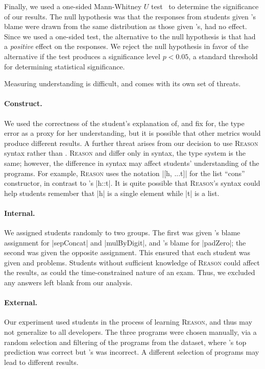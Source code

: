 Finally, we used a one-sided Mann-Whitney $U$ test~\cite{Mann1947-fd} to
determine the significance of our results.
%
The null hypothesis was that the responses from students given
\toolname's blame were drawn from the same distribution as those
given \sherrloc's, \ie \toolname had no effect.
%
Since we used a one-sided test, the alternative to the null hypothesis
is that \toolname had a \emph{positive} effect on the responses.
%
We reject the null hypothesis in favor of the alternative if the test
produces a significance level $p < 0.05$, a standard threshold for
determining statistical significance.

%
Measuring understanding is difficult, and comes with its own
set of threats. %

\paragraph{Construct.}
%
We used the correctness of the student's explanation of, and fix for,
the type error as a proxy for her understanding, but it is possible
that other metrics would produce different results.
%
A further threat arises from our decision to use \textsc{Reason} syntax
rather than \ocaml.
%
\textsc{Reason} and \ocaml differ only in syntax, the type system is the
same; however, the difference in syntax may affect students'
understanding of the programs.
%
For example, \textsc{Reason} uses the notation |[h, ...t]| for the list
``cons'' constructor, in contrast to \ocaml's |h::t|.
%
It is quite possible that \textsc{Reason}'s syntax could help students
remember that |h| is a single element while |t| is a list.

\paragraph{Internal.}
%
We assigned students randomly to two groups. The first was given
\sherrloc's blame assignment for |sepConcat| and |mulByDigit|, and
\toolname's blame for |padZero|; the second was given the opposite
assignment. This ensured that each student was given \sherrloc and
\toolname problems. Students without sufficient knowledge of
\textsc{Reason} could affect the results, as could the time-constrained
nature of an exam. Thus, we excluded any answers left blank
from our analysis.

\paragraph{External.}
%
Our experiment used students in the process of learning \textsc{Reason},
and thus may not generalize to all developers. The three programs were
chosen manually, via a random selection and filtering of the programs
from the \SPRING dataset, where \toolname's top prediction was correct
but \sherrloc's was incorrect. A different selection of programs may
lead to different results.

